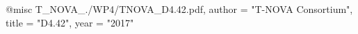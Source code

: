 @misc{ T_NOVA_./WP4/TNOVA_D4.42.pdf,
       author = "{T-NOVA Consortium}",
       title = "D4.42",
       year = "2017" }
